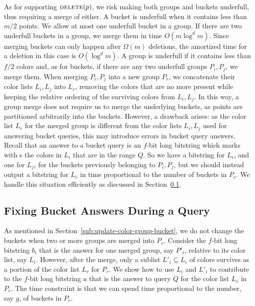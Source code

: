 As for supporting $\textsc{delete}(p)$, we risk making both groups and buckets underfull, thus requiring a merge of either. A bucket is underfull when it contains less than $m/2$ points. We allow at most one underfull bucket in a group. If there are two underfull buckets in a group, we merge them in time $O(m \log^d m)$. Since merging buckets can only happen after $\Omega(m)$ deletions, the amortized time for a deletion in this case is $O(\log^d m)$. A group is underfull if it contains less than $f/2$ colors and, as for buckets, if there are any two underfull groups $P_i, P_j$, we merge them. When merging $P_i, P_j$ into a new group $P_r$, we concatenate their color lists $L_i, L_j$ into $L_r$, removing the colors that are no more present while keeping the relative ordering of the surviving colors from $L_i, L_j$. In this way, a group merge does not require us to merge the underlying buckets, as points are partitioned arbitrarily into the buckets. However, a drawback arises: as the color list $L_r$ for the merged group is different from the color lists $L_i, L_j$ used for answering bucket queries, this may introduce errors in bucket query answers. Recall that an answer to a bucket query is an $f$-bit long bitstring which marks with {\bitone}s the colors in $L_i$ that are in the range $Q$. So we have a bitstring for $L_i$, and one for $L_j$, for the buckets previously belonging to $P_i, P_j$, but we should instead output a bitstring for $L_r$ in time proportional to the number of buckets in $P_r$. We handle this situation efficiently as discussed in Section~\ref{sub:fixing-bucket-answers}.

\subsection{Fixing Bucket Answers During a Query}
\label{sub:fixing-bucket-answers}
%
As mentioned in Section~\ref{sub:update-color-group-bucket}, we do not change the buckets when two or more groups are merged into $P_r$. Consider the $f$-bit long bitstring $b_i$ that is the answer for one merged group, say $P'_i$, relative to its color list, say $L_i$. However, after the merge, only a sublist $L'_i \subseteq L_i$ of colors survives as a portion of the color list $L_r$ for $P_r$. We show how to use $L_i$ and $L'_i$ to contribute to the $f$-bit long bitstring $a$ that is the answer to query $Q$ for the color list $L_r$ in $P_r$. The time constraint is that we can spend time proportional to the number, say $g$, of buckets in $P_r$. 




